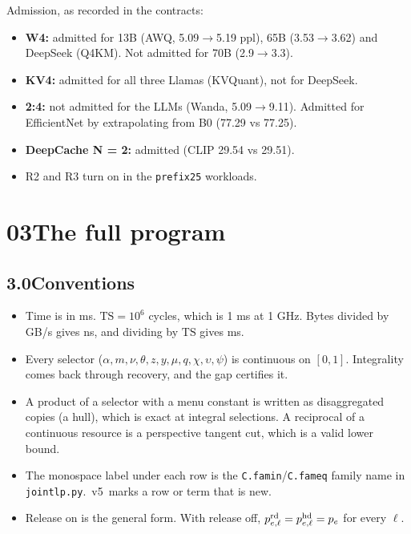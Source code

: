 \documentclass[10pt]{article}
\newcommand{\badge}[2]{{\footnotesize\sffamily\colorbox{#1bg}{\textcolor{#1}{\,#2\,}}}}
\renewcommand{\_}{\textunderscore\allowbreak}
\begin{document}
Admission, as recorded in the contracts:

 
\begin{itemize}
 \item \textbf{W4:} admitted for 13B (AWQ, 5.09$\to$5.19 ppl), 65B (3.53$\to$3.62) and DeepSeek (Q4\_K\_M). Not admitted for 70B (2.9$\to$3.3).
 \item \textbf{KV4:} admitted for all three Llamas (KVQuant), not for DeepSeek.
 \item \textbf{2:4:} not admitted for the LLMs (Wanda, 5.09$\to$9.11). Admitted for EfficientNet by extrapolating from B0 (77.29 vs 77.25).
 \item \textbf{DeepCache N = 2:} admitted (CLIP 29.54 vs 29.51).
 \item R2 and R3 turn on in the \texttt{\_\_prefix25} workloads.
 
\end{itemize}
   
\section*{03\quad The full program}
 
\subsection*{3.0\quad Conventions}
 
\begin{itemize}
 \item Time is in ms. $\mathrm{TS}=10^6$ cycles, which is 1 ms at 1 GHz. Bytes divided by GB/s gives ns, and dividing by $\mathrm{TS}$ gives ms.
 \item Every selector ($\alpha,\allowbreak{}m,\allowbreak{}\nu,\allowbreak{}\theta,\allowbreak{}z,\allowbreak{}y,\allowbreak{}\mu,\allowbreak{}q,\allowbreak{}\chi,\allowbreak{}\upsilon,\allowbreak{}\psi$) is continuous on $[0,\allowbreak{}1]$. Integrality comes back through recovery, and the gap certifies it.
 \item A product of a selector with a menu constant is written as disaggregated copies (a hull), which is exact at integral selections. A reciprocal of a continuous resource is a perspective tangent cut, which is a valid lower bound.
 \item The monospace label under each row is the \texttt{C.fam\_in}/\texttt{C.fam\_eq} family name in \texttt{joint\_lp.py}. \badge{newc}{v5} marks a row or term that is new.
 \item Release on is the general form. With release off, $p^{\rm rd}_{e,\allowbreak{}\ell}=p^{\rm hd}_{e,\allowbreak{}\ell}=p_e$ for every $\ell$.
 
\end{itemize}
 
\end{document}
